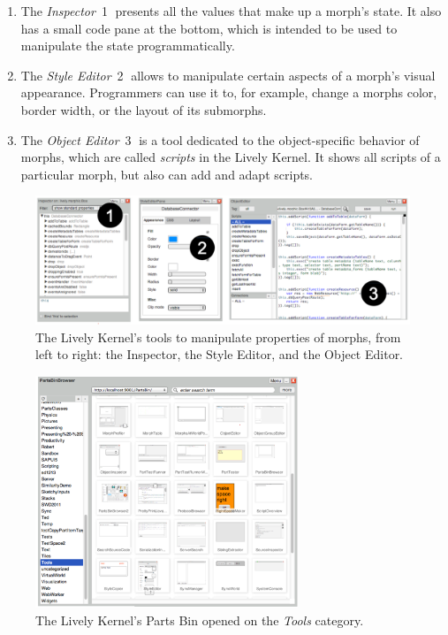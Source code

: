 \begin{enumerate}
    \item The \emph{Inspector}~\textcircled{1} presents all the values that make up a morph's state. It also has a small code pane at the bottom, which is intended to be used to manipulate the state programmatically.
    \item The \emph{Style Editor}~\textcircled{2} allows to manipulate certain aspects of a morph's visual appearance. Programmers can use it to, for example, change a morphs color, border width, or the layout of its submorphs.
    \item The \emph{Object Editor}~\textcircled{3} is a tool dedicated to the object-specific behavior of morphs, which are called \emph{scripts} in the Lively Kernel. It shows all scripts of a particular morph, but also can add and adapt scripts.
\end{enumerate}


\begin{figure}[h]
    \centering
    \includegraphics[width=\textwidth]{figures/2_background/2_LivelyTools.pdf}
    \caption{The Lively Kernel's tools to manipulate properties of morphs, from left to right: the Inspector, the Style Editor, and the Object Editor.}
    \label{fig:LivelyTools}
\end{figure}

\begin{figure}[h]
    \centering
    \includegraphics[width=0.7\textwidth]{figures/2_background/3_partsBin.pdf}
    \caption{The Lively Kernel's Parts Bin opened on the \emph{Tools} category.}
    \label{fig:PartsBin}
\end{figure}


